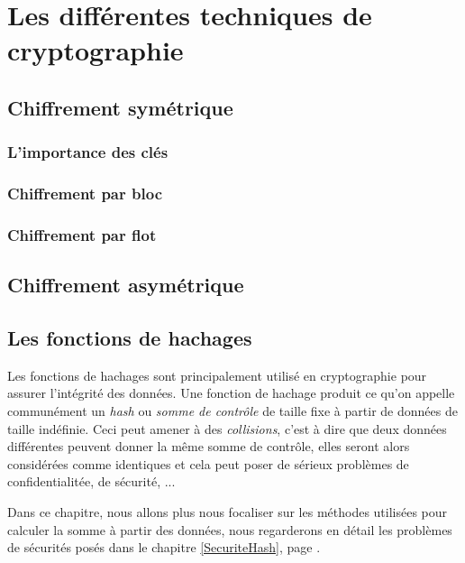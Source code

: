 \chapter{Les différentes techniques de cryptographie}





\section{Chiffrement symétrique}
\subsection{L'importance des clés}
\subsection{Chiffrement par bloc}
\subsection{Chiffrement par flot}

\section{Chiffrement asymétrique}

\section{Les fonctions de hachages}
Les fonctions de hachages sont principalement utilisé en cryptographie
pour assurer l'intégrité des données. Une fonction de hachage produit
ce qu'on appelle communément un \emph{hash} ou \emph{somme de
  contrôle}  de taille fixe à partir de
données de taille indéfinie. Ceci peut amener à des \emph{collisions},
c'est à dire que deux données différentes peuvent donner la même somme
de contrôle, elles seront alors considérées comme identiques et cela
peut poser de sérieux problèmes de confidentialitée, de sécurité, ...

Dans ce chapitre, nous allons plus nous focaliser sur les méthodes
utilisées pour calculer la somme à partir des données, nous
regarderons en détail les problèmes de sécurités posés dans le
chapitre \ref{SecuriteHash}, page \pageref{SecuriteHash}.


